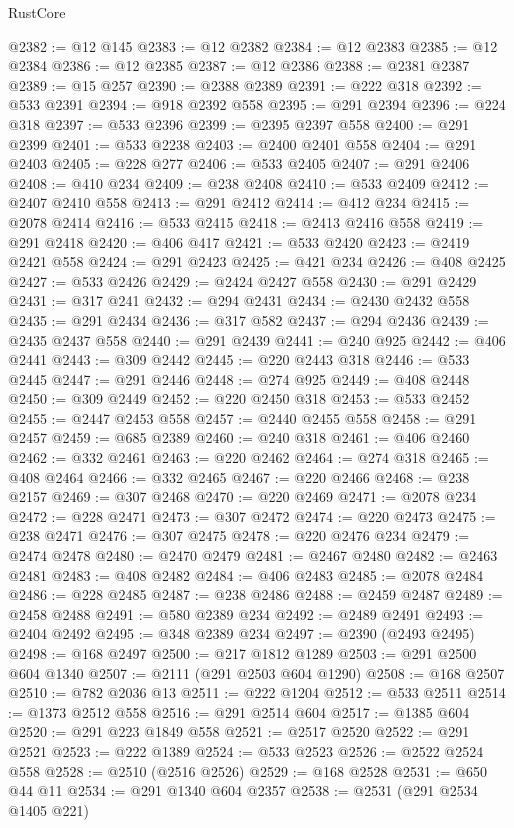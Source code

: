 \begin{lexlean}{RustCore}
\begin{coremodule}
@2382 := @12 @145
@2383 := @12 @2382
@2384 := @12 @2383
@2385 := @12 @2384
@2386 := @12 @2385
@2387 := @12 @2386
@2388 := @2381 @2387
@2389 := @15 @257
@2390 := @2388 @2389
@2391 := @222 @318
@2392 := @533 @2391
@2394 := @918 @2392 @558
@2395 := @291 @2394
@2396 := @224 @318
@2397 := @533 @2396
@2399 := @2395 @2397 @558
@2400 := @291 @2399
@2401 := @533 @2238
@2403 := @2400 @2401 @558
@2404 := @291 @2403
@2405 := @228 @277
@2406 := @533 @2405
@2407 := @291 @2406
@2408 := @410 @234
@2409 := @238 @2408
@2410 := @533 @2409
@2412 := @2407 @2410 @558
@2413 := @291 @2412
@2414 := @412 @234
@2415 := @2078 @2414
@2416 := @533 @2415
@2418 := @2413 @2416 @558
@2419 := @291 @2418
@2420 := @406 @417
@2421 := @533 @2420
@2423 := @2419 @2421 @558
@2424 := @291 @2423
@2425 := @421 @234
@2426 := @408 @2425
@2427 := @533 @2426
@2429 := @2424 @2427 @558
@2430 := @291 @2429
@2431 := @317 @241
@2432 := @294 @2431
@2434 := @2430 @2432 @558
@2435 := @291 @2434
@2436 := @317 @582
@2437 := @294 @2436
@2439 := @2435 @2437 @558
@2440 := @291 @2439
@2441 := @240 @925
@2442 := @406 @2441
@2443 := @309 @2442
@2445 := @220 @2443 @318
@2446 := @533 @2445
@2447 := @291 @2446
@2448 := @274 @925
@2449 := @408 @2448
@2450 := @309 @2449
@2452 := @220 @2450 @318
@2453 := @533 @2452
@2455 := @2447 @2453 @558
@2457 := @2440 @2455 @558
@2458 := @291 @2457
@2459 := @685 @2389
@2460 := @240 @318
@2461 := @406 @2460
@2462 := @332 @2461
@2463 := @220 @2462
@2464 := @274 @318
@2465 := @408 @2464
@2466 := @332 @2465
@2467 := @220 @2466
@2468 := @238 @2157
@2469 := @307 @2468
@2470 := @220 @2469
@2471 := @2078 @234
@2472 := @228 @2471
@2473 := @307 @2472
@2474 := @220 @2473
@2475 := @238 @2471
@2476 := @307 @2475
@2478 := @220 @2476 @234
@2479 := @2474 @2478
@2480 := @2470 @2479
@2481 := @2467 @2480
@2482 := @2463 @2481
@2483 := @408 @2482
@2484 := @406 @2483
@2485 := @2078 @2484
@2486 := @228 @2485
@2487 := @238 @2486
@2488 := @2459 @2487
@2489 := @2458 @2488
@2491 := @580 @2389 @234
@2492 := @2489 @2491
@2493 := @2404 @2492
@2495 := @348 @2389 @234
@2497 := @2390 (@2493 @2495)
@2498 := @168 @2497
@2500 := @217 @1812 @1289
@2503 := @291 @2500 @604 @1340
@2507 := @2111 (@291 @2503 @604 @1290)
@2508 := @168 @2507
@2510 := @782 @2036 @13
@2511 := @222 @1204
@2512 := @533 @2511
@2514 := @1373 @2512 @558
@2516 := @291 @2514 @604
@2517 := @1385 @604
@2520 := @291 @223 @1849 @558
@2521 := @2517 @2520
@2522 := @291 @2521
@2523 := @222 @1389
@2524 := @533 @2523
@2526 := @2522 @2524 @558
@2528 := @2510 (@2516 @2526)
@2529 := @168 @2528
@2531 := @650 @44 @11
@2534 := @291 @1340 @604 @2357
@2538 := @2531 (@291 @2534 @1405 @221)

\end{coremodule}
\end{lexlean}
